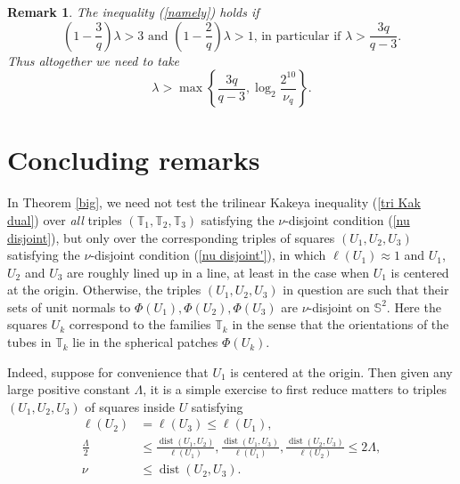 \documentclass{amsart}%
\theoremstyle{plain}
\newtheorem{remark}[theorem]{Remark}
\numberwithin{equation}{section}
\begin{document}
\begin{remark}
\label{param}The inequality (\ref{namely}) holds if
\[
\left(  1-\frac{3}{q}\right)  \lambda>3\text{ and }\left(  1-\frac{2}%
{q}\right)  \lambda>1\text{, in particular if }\lambda>\frac{3q}{q-3}.
\]
Thus altogether we need to take%
\[
\lambda>\max\left\{  \frac{3q}{q-3},\log_{2}\frac{2^{10}}{\nu_{q}}\right\}  .
\]

\end{remark}

\section{Concluding remarks}

In Theorem \ref{big}, we need not test the trilinear Kakeya inequality
(\ref{tri Kak dual}) over \emph{all} triples $\left(  \mathbb{T}%
_{1},\mathbb{T}_{2},\mathbb{T}_{3}\right)  $ satisfying the $\nu$-disjoint
condition (\ref{nu disjoint}), but only over the corresponding triples of
squares $\left(  U_{1},U_{2},U_{3}\right)  $ satisfying the $\nu$-disjoint
condition (\ref{nu disjoint'}), in which $\ell\left(  U_{1}\right)  \approx1$
and $U_{1}$, $U_{2}$ and $U_{3}$ are roughly lined up in a line, at least in
the case when $U_{1}$ is centered at the origin. Otherwise, the triples
$\left(  U_{1},U_{2},U_{3}\right)  $ in question are such that their sets of
unit normals to $\Phi\left(  U_{1}\right)  ,\Phi\left(  U_{2}\right)
,\Phi\left(  U_{3}\right)  $ are $\nu$-disjoint on $\mathbb{S}^{2}$. Here the
squares $U_{k}$ correspond to the families $\mathbb{T}_{k}$ in the sense that
the orientations of the tubes in $\mathbb{T}_{k}$ lie in the spherical patches
$\Phi\left(  U_{k}\right)  $.

Indeed, suppose for convenience that $U_{1}$ is centered at the origin. Then
given any large positive constant $\Lambda$, it is a simple exercise to first
reduce matters to triples $\left(  U_{1},U_{2},U_{3}\right)  $ of squares
inside $U$ satisfying%
\begin{align}
\ell\left(  U_{2}\right)   &  =\ell\left(  U_{3}\right)  \leq\ell\left(
U_{1}\right)  ,\label{nu disjoint''}\\
\frac{\Lambda}{2}  &  \leq\frac{\operatorname*{dist}\left(  U_{1}%
,U_{2}\right)  }{\ell\left(  U_{1}\right)  },\frac{\operatorname*{dist}\left(
U_{1},U_{3}\right)  }{\ell\left(  U_{1}\right)  },\frac{\operatorname*{dist}%
\left(  U_{2},U_{3}\right)  }{\ell\left(  U_{2}\right)  }\leq2\Lambda
,\nonumber\\
\nu &  \leq\operatorname*{dist}\left(  U_{2},U_{3}\right)  .\nonumber
\end{align}
\end{document}
